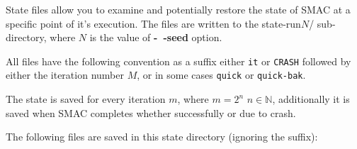 \documentclass[manual.tex]{subfiles}
\begin{document}
State files allow you to examine and potentially restore the state of SMAC at a specific point of it's execution. The files are written to the state-run$N$/ sub-directory, where $N$ is the value of \textbf{-~$\!$-seed} option. 


All files have the following convention as a suffix either \texttt{it} or \texttt{CRASH} followed by either the iteration number $M$, or in some cases \texttt{quick} or \texttt{quick-bak}.

The state is saved for every iteration $m$, where $m=2^{n}$ $n \in \mathbb{N}$, additionally it is saved when SMAC completes whether successfully or due to crash.

The following files are saved in this state directory (ignoring the suffix):
\end{document}
